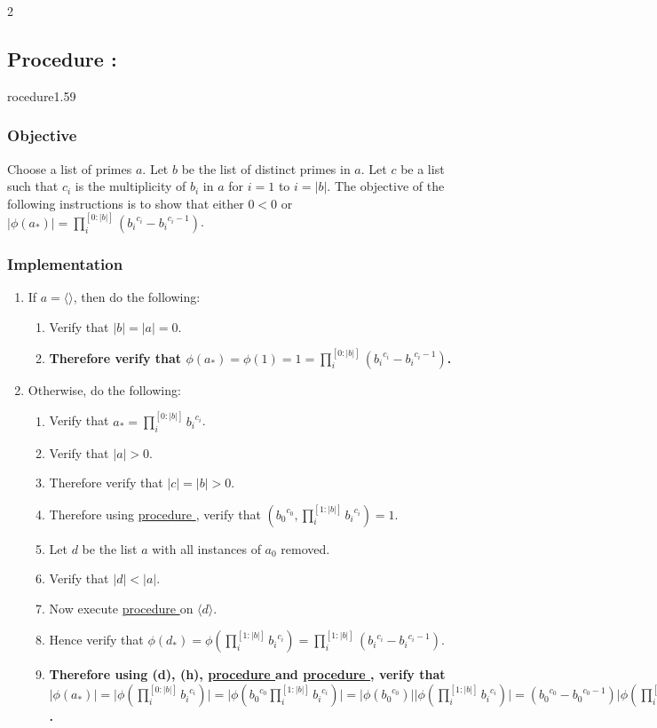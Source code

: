 \documentclass{article}
\newcounter{procedure}[part]
\newcommand{\procedure}[1]{\subsection*{Procedure \thepart:\theprocedure}\label{sec:procedure #1}\global\expandafter\edef\csname procedure#1\endcsname{\thepart:\theprocedure}\addtocounter{procedure}{1}}
\newcommand{\objective}{\subsubsection*{Objective}}
\newcommand{\implementation}{\subsubsection*{Implementation}}
\newcommand{\procedurehr}[1]{\hyperref[sec:procedure #1]{procedure \expandafter\csname procedure#1\endcsname}}
\begin{document}
\begin{multicols}{2}
\begin{enumerate}
				\end{enumerate}
		\procedure{1.59}
			\objective
				Choose a list of primes $a$. Let $b$ be the list of distinct primes in $a$. Let $c$ be a list such that $c_i$ is the multiplicity of $b_i$ in $a$ for $i=1$ to $i=\lvert b\rvert$. The objective of the following instructions is to show that either $0<0$ or $\lvert\phi(a_*)\rvert=\prod_i^{[0:{\lvert b\rvert}]}({b_i}^{c_i}-{b_i}^{c_i-1})$.
			\implementation
				\begin{enumerate}
					\item If $a=\langle\rangle$, then do the following:
					\begin{enumerate}
						\item Verify that $\lvert b\rvert=\lvert a\rvert=0$.
						\item \textbf{Therefore verify that $\phi(a_*)=\phi(1)=1=\prod_i^{[0:{\lvert b\rvert}]}({b_i}^{c_i}-{b_i}^{c_i-1})$.}
					\end{enumerate}
					\item Otherwise, do the following:
					\begin{enumerate}
						\item Verify that $a_*=\prod_i^{[0:{\lvert b\rvert}]} {b_i}^{c_i}$.
						\item Verify that $\lvert a\rvert>0$.
						\item Therefore verify that $\lvert c\rvert=\lvert b\rvert>0$.
						\item Therefore using \procedurehr{1.30}, verify that $({b_0}^{c_0},\prod_i^{[1:{\lvert b\rvert}]}{b_i}^{c_i})=1$.
						\item Let $d$ be the list $a$ with all instances of $a_0$ removed.
						\item Verify that $\lvert d\rvert<\lvert a\rvert$.
						\item Now execute \procedurehr{1.59} on $\langle d\rangle$.
						\item Hence verify that $\phi(d_*)=\phi(\prod_i^{[1:{\lvert b\rvert}]}{b_i}^{c_i})=\prod_i^{[1:{\lvert b\rvert}]}({b_i}^{c_i}-{b_i}^{c_i-1})$.
						\item \textbf{Therefore using (d), (h), \procedurehr{1.57} and \procedurehr{1.58}, verify that $\lvert\phi(a_*)\rvert=\lvert\phi(\prod_i^{[0:{\lvert b\rvert}]} {b_i}^{c_i})\rvert=\lvert\phi({b_0}^{c_0}\prod_i^{[1:{\lvert b\rvert}]}{b_i}^{c_i})\rvert=\lvert\phi({b_0}^{c_0})\rvert\lvert\phi(\prod_i^{[1:{\lvert b\rvert}]}{b_i}^{c_i})\rvert=({b_0}^{c_0}-{b_0}^{c_0-1})\lvert\phi(\prod_i^{[1:{\lvert b\rvert}]}{b_i}^{c_i})\rvert=({b_0}^{c_0}-{b_0}^{c_0-1})\prod_i^{[1:{\lvert b\rvert}]}({b_i}^{c_i}-{b_i}^{c_i-1})=\prod_i^{[0:{\lvert b\rvert}]}({b_i}^{c_i}-{b_i}^{c_i-1})$.}

\end{enumerate}
\end{enumerate}
\end{multicols}
\end{document}
